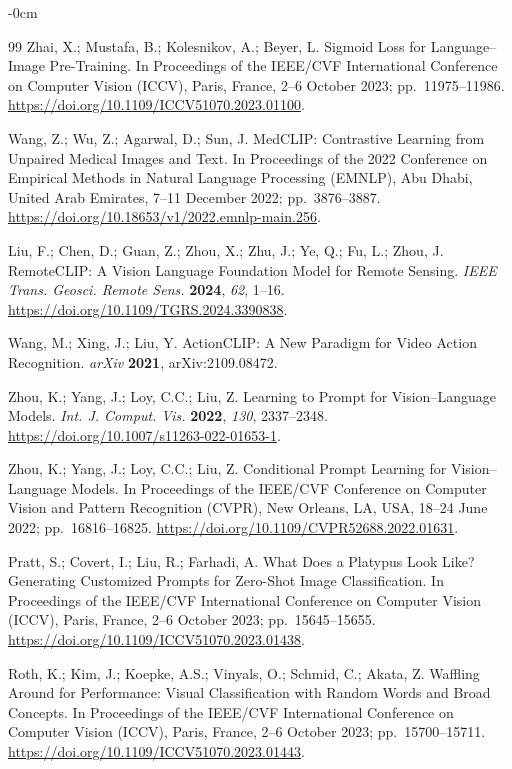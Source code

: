 \documentclass[symmetry,article,submit,pdftex,moreauthors]{Definitions/mdpi}
\begin{document}
\begin{adjustwidth}{-\extralength}{0cm}
\begin{thebibliography}{99}
Zhai, X.; Mustafa, B.; Kolesnikov, A.; Beyer, L.
Sigmoid Loss for Language--Image Pre-Training.
In Proceedings of the IEEE/CVF International Conference on Computer Vision (ICCV), Paris, France, 2--6 October 2023; pp.~11975--11986. \url{https://doi.org/10.1109/ICCV51070.2023.01100}.

Wang, Z.; Wu, Z.; Agarwal, D.; Sun, J.
MedCLIP: Contrastive Learning from Unpaired Medical Images and Text.
In Proceedings of the 2022 Conference on Empirical Methods in Natural Language Processing (EMNLP), Abu Dhabi, United Arab Emirates, 7--11 December 2022; pp.~3876--3887. \url{https://doi.org/10.18653/v1/2022.emnlp-main.256}.

Liu, F.; Chen, D.; Guan, Z.; Zhou, X.; Zhu, J.; Ye, Q.; Fu, L.; Zhou, J.
RemoteCLIP: A Vision Language Foundation Model for Remote Sensing.
\textit{IEEE Trans. Geosci. Remote Sens.} \textbf{2024}, \textit{62}, 1--16. \url{https://doi.org/10.1109/TGRS.2024.3390838}.

Wang, M.; Xing, J.; Liu, Y.
ActionCLIP: A New Paradigm for Video Action Recognition.
\textit{arXiv} \textbf{2021}, arXiv:2109.08472.

Zhou, K.; Yang, J.; Loy, C.C.; Liu, Z.
Learning to Prompt for Vision--Language Models.
\textit{Int. J. Comput. Vis.} \textbf{2022}, \textit{130}, 2337--2348. \url{https://doi.org/10.1007/s11263-022-01653-1}.

Zhou, K.; Yang, J.; Loy, C.C.; Liu, Z.
Conditional Prompt Learning for Vision--Language Models.
In Proceedings of the IEEE/CVF Conference on Computer Vision and Pattern Recognition (CVPR), New Orleans, LA, USA, 18--24 June 2022; pp.~16816--16825. \url{https://doi.org/10.1109/CVPR52688.2022.01631}.

Pratt, S.; Covert, I.; Liu, R.; Farhadi, A.
What Does a Platypus Look Like? Generating Customized Prompts for Zero-Shot Image Classification.
In Proceedings of the IEEE/CVF International Conference on Computer Vision (ICCV), Paris, France, 2--6 October 2023; pp.~15645--15655. \url{https://doi.org/10.1109/ICCV51070.2023.01438}.

Roth, K.; Kim, J.; Koepke, A.S.; Vinyals, O.; Schmid, C.; Akata, Z.
Waffling Around for Performance: Visual Classification with Random Words and Broad Concepts.
In Proceedings of the IEEE/CVF International Conference on Computer Vision (ICCV), Paris, France, 2--6 October 2023; pp.~15700--15711. \url{https://doi.org/10.1109/ICCV51070.2023.01443}.


\end{thebibliography}
\end{adjustwidth}
\end{document}
